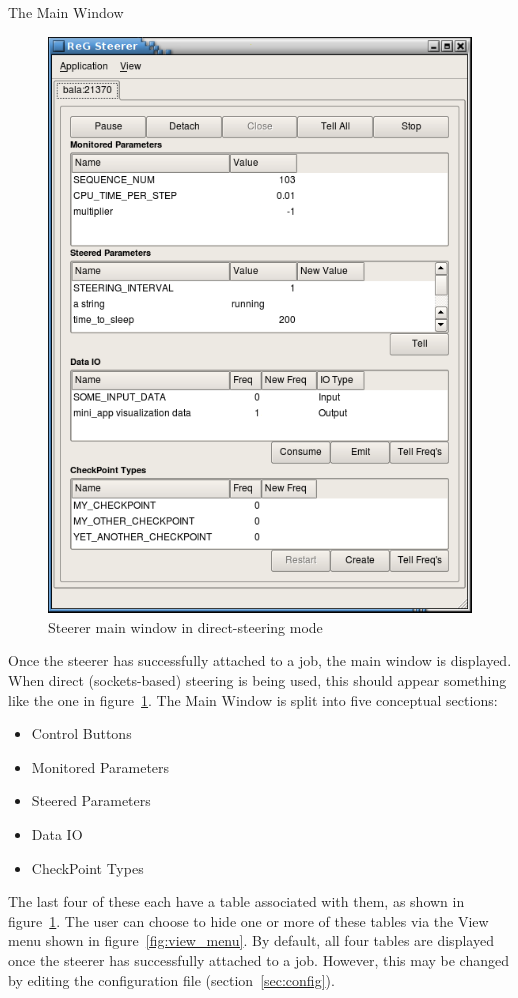 \documentclass[a4paper,twoside]{article}
\begin{document}
\begin{section}{The Main Window}

\begin{figure}
\centerline{\includegraphics{main_sockets.png}}
\caption{Steerer main window in direct-steering mode}
\label{fig:main_socks}
\end{figure}

Once the steerer has successfully attached to a job, the main window
is displayed.  When direct (sockets-based) steering is being used, this
should appear something like the one in figure~\ref{fig:main_socks}.
The Main Window is split into five conceptual sections:
\begin{itemize}
\item Control Buttons
\item Monitored Parameters
\item Steered Parameters
\item Data IO
\item CheckPoint Types
\end{itemize}
The last four of these each have a table associated with them, as
shown in figure~\ref{fig:main_socks}.  The user can choose to hide one
or more of these tables via the View menu shown in
figure~\ref{fig:view_menu}.  By default, all four tables are displayed
once the steerer has successfully attached to a job.  However, this
may be changed by editing the configuration file
(section~\ref{sec:config}).


\end{section}
\end{document}
